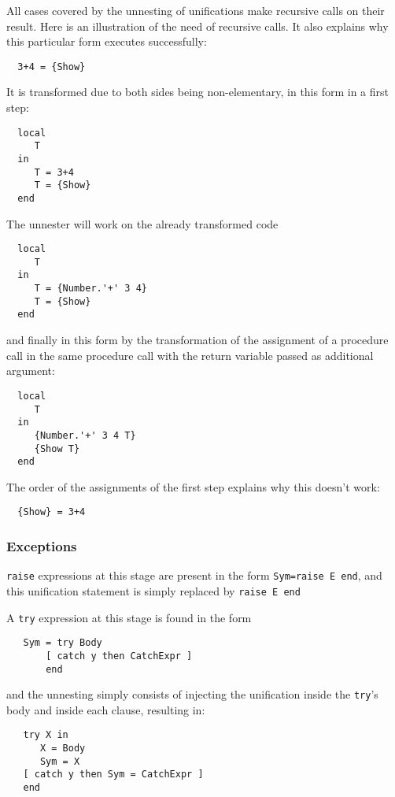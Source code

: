 \documentclass[a4paper]{memoir}
\begin{document}
All cases covered by the unnesting of unifications make recursive calls on their
result.
Here is an illustration of the need of recursive calls. It also explains why
this particular form executes successfully:
\begin{lstlisting}
  3+4 = {Show}
\end{lstlisting}
It is transformed due to both sides being non-elementary, in this form in a first step:
\begin{lstlisting}
  local
     T
  in
     T = 3+4
     T = {Show}
  end
\end{lstlisting}
The unnester will work on the already transformed code
\begin{lstlisting}
  local
     T
  in
     T = {Number.'+' 3 4}
     T = {Show}
  end
\end{lstlisting}
and finally in this form by the transformation of the assignment of a procedure call in the same procedure call with the return variable passed as additional argument:
\begin{lstlisting}
  local
     T
  in
     {Number.'+' 3 4 T}
     {Show T}
  end
\end{lstlisting}
The order of the assignments of the first step explains why this doesn't work:
\begin{lstlisting}
  {Show} = 3+4
\end{lstlisting}

\subsubsection{Exceptions}\label{sec:arch:unnester:exceptions}
\lstinline!raise! expressions at this stage are present in the form
\lstinline!Sym=raise E end!, and this unification statement is simply replaced by
\lstinline!raise E end! 

A \lstinline!try! expression at this stage is found in the form 
\begin{lstlisting}
   Sym = try Body 
       [ catch y then CatchExpr ] 
       end
\end{lstlisting}
and the unnesting simply consists of injecting the unification inside the
\lstinline!try!'s body and inside each clause, resulting in:
\begin{lstlisting}
   try X in 
      X = Body 
      Sym = X 
   [ catch y then Sym = CatchExpr ] 
   end
\end{lstlisting}
\end{document}
